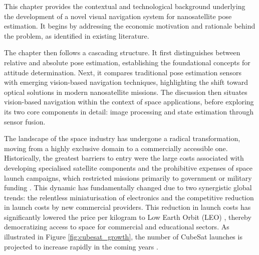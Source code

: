 \label{chap:literature}

\label{sec:litintro}

\noindent
This chapter provides the contextual and technological background underlying the development of a novel visual navigation system for nanosatellite pose estimation. 
It begins by addressing the economic motivation and rationale behind the problem, as identified in existing literature.
\vspace{0.5cm}

\noindent
The chapter then follows a cascading structure. It first distinguishes between relative and absolute pose estimation, establishing the foundational 
concepts for attitude determination. Next, it compares traditional pose estimation sensors with emerging vision-based navigation techniques, 
highlighting the shift toward optical solutions in modern nanosatellite missions. The discussion then situates vision-based navigation within the 
context of space applications, before exploring its two core components in detail: image processing and state estimation through sensor fusion.

\label{sec:}

\noindent
The landscape of the space industry has undergone a radical transformation, moving from a highly exclusive domain to a commercially 
accessible one. Historically, the greatest barriers to entry were the large costs associated with developing specialised satellite components 
and the prohibitive expenses of space launch campaigns, which restricted missions primarily to government or military funding \cite{Jones, Drenthe}. 
This dynamic has fundamentally changed due to two synergistic global trends: the relentless miniaturisation of electronics and the competitive reduction in launch 
costs by new commercial providers. This reduction in launch costs has significantly lowered the price per kilogram to Low Earth Orbit (LEO) \cite{Adilov}, thereby democratizing access to space for commercial and educational sectors. As illustrated in Figure \ref{fig:cubesat_growth}, the number of CubeSat launches is projected to increase rapidly in the coming years \cite{Nagel,Villela,bouwmeester2010}.
\vspace{0.5cm}

